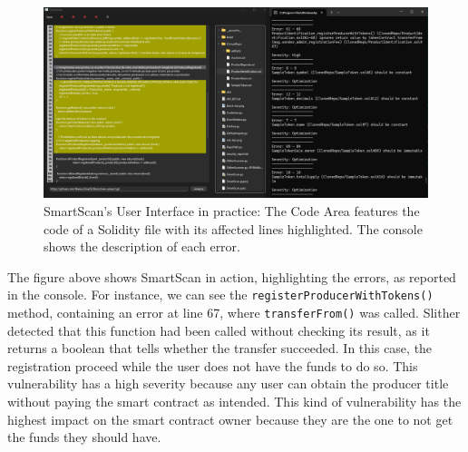 \begin{figure}[h]
    \centering
    \includegraphics[width=1\linewidth]{images/highlighted-errors.png}
    \caption{SmartScan's User Interface in practice: The Code Area features the code of a Solidity file with its affected lines highlighted. The console shows the description of each error.}
    \label{fig:enter-label}
\end{figure}

The figure above shows SmartScan in action, highlighting the errors, as reported in the console. For instance, we can see the \texttt{registerProducerWithTokens()} method, containing an error at line 67, where \texttt{transferFrom()}\cite{solidityDocs} was called. Slither detected that this function had been called without checking its result, as it returns a boolean that tells whether the transfer succeeded. In this case, the registration proceed while the user does not have the funds to do so. This vulnerability has a high severity because any user can obtain the producer title without paying the smart contract as intended. This kind of vulnerability has the highest impact on the smart contract owner because they are the one to not get the funds they should have.





